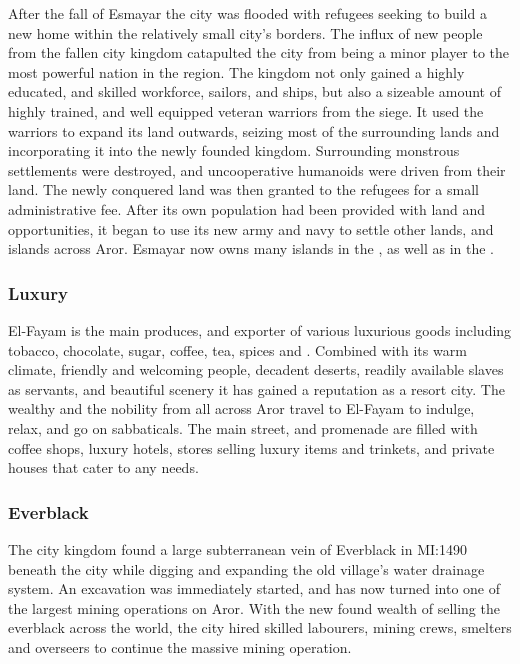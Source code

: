 After the fall of Esmayar the city was flooded with refugees seeking to build
a new home within the relatively small city's borders. The influx of new
people from the fallen city kingdom catapulted the city from being a minor
player to the most powerful nation in the region. The kingdom not only gained
a highly educated, and skilled workforce, sailors, and ships, but also a
sizeable amount of highly trained, and well equipped veteran warriors from the
siege. It used the warriors to expand its land outwards, seizing most of the
surrounding lands and incorporating it into the newly founded
kingdom. Surrounding monstrous settlements were destroyed, and uncooperative
humanoids were driven from their land. The newly conquered land was then
granted to the refugees for a small administrative fee. After its own
population had been provided with land and opportunities, it began to use its
new army and navy to settle other lands, and islands across Aror. Esmayar now
owns many islands in the , as well as in the
.

\subsubsection{Luxury}

El-Fayam is the main produces, and exporter of various luxurious goods
including tobacco, chocolate, sugar, coffee, tea, spices
and . Combined with its warm climate, friendly and
welcoming people, decadent deserts, readily available slaves as servants, and
beautiful scenery it has gained a reputation as a resort city. The wealthy and
the nobility from all across Aror travel to El-Fayam to indulge, relax, and go
on sabbaticals. The main street, and promenade are filled with coffee shops,
luxury hotels, stores selling luxury items and trinkets, and private houses
that cater to any needs.

\subsubsection{Everblack}

The city kingdom found a large subterranean vein of Everblack in MI:1490
beneath the city while digging and expanding the old village's water drainage
system. An excavation was immediately started, and has now turned into one of
the largest mining operations on Aror. With the new found wealth of selling
the everblack across the world, the city hired skilled labourers, mining
crews, smelters and overseers to continue the massive mining operation.

